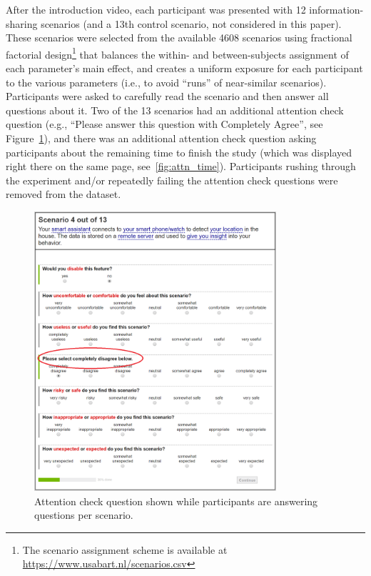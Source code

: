 After the introduction video, each participant was presented with 12 information-sharing scenarios (and a 13th control scenario, not considered in this paper). These scenarios were selected from the available 4608 scenarios using fractional factorial design\footnote{The scenario assignment scheme is available at \url{https://www.usabart.nl/scenarios.csv}} that balances the within- and between-subjects assignment of each parameter's main effect, and creates a uniform exposure for each participant to the various parameters (i.e., to avoid ``runs'' of near-similar scenarios). Participants were asked to carefully read the scenario and then answer all questions about it. Two of the 13 scenarios had an additional attention check question (e.g., ``Please answer this question with Completely Agree'', see Figure~\ref{fig:attn_S}), and there was an additional attention check question asking participants about the remaining time to finish the study (which was displayed right there on the same page, see~\ref{fig:attn_time}). Participants rushing through the experiment and/or repeatedly failing the attention check questions were removed from the dataset.

\begin{figure}
	\centering
	\includegraphics[width=0.8\textwidth]{figures/scenario_attn.PNG}
	\caption{Attention check question shown while participants are answering questions per scenario.}
	\label{fig:attn_S}
\end{figure}


